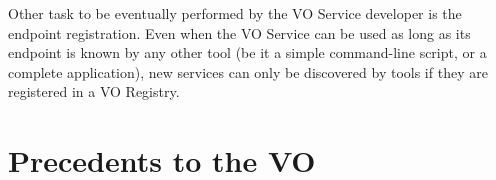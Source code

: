 		Other task to be eventually performed by the VO Service
		developer is the endpoint registration. Even when the VO
		Service can be used as long as its endpoint is known by any
		other tool (be it a simple command-line script, or a
		complete application), new services can only be discovered
		by tools if they are registered in a VO Registry.


	
	\section{Precedents to the VO} %
	\label{sec:precedents_to_the_vo}
		
		
		
